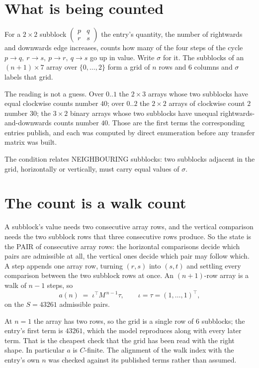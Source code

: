 \documentclass[11pt,a4paper]{article}
\theoremstyle{plain}
\theoremstyle{definition}
\begin{document}
\section{What is being counted}

For a $2\times2$ subblock $\begin{pmatrix}p&q\\r&s\end{pmatrix}$ the
entry's quantity, the number of rightwards and downwards edge increases, counts how many of the four steps of the cycle $p\to q,\ r\to s,\ p\to r,\ q\to s$ go up in value. Write $\sigma$ for it. The subblocks of an
$(n+1)\times7$ array over $\{0,\dots,2\}$ form a grid of $n$ rows and $6$
columns and $\sigma$ labels that grid.

The reading is not a guess. Over $0..1$ the $2\times3$ arrays whose two subblocks have equal
clockwise counts number $40$; over $0..2$ the $2\times2$ arrays of clockwise count $2$ number
$30$; the $3\times2$ binary arrays whose two subblocks have unequal rightwards-and-downwards
counts number $40$. Those are the first terms the corresponding entries publish, and each was
computed by direct enumeration before any transfer matrix was built.

The condition relates NEIGHBOURING subblocks: two subblocks adjacent in the grid, horizontally
or vertically, must carry equal values of $\sigma$.

\section{The count is a walk count}

A subblock's value needs two consecutive array rows, and the vertical
comparison needs the two subblock rows that three consecutive rows produce. So the state is the
PAIR of consecutive array rows: the horizontal comparisons decide which pairs are admissible at
all, the vertical ones decide which pair may follow which. A step appends one array row,
turning $(r,s)$ into $(s,t)$ and settling every comparison between the two subblock rows at
once. An $(n+1)$-row array is a walk of $n-1$ steps, so
\[
a(n)\;=\;\iota^{\!\top}M^{\,n-1}\tau,\qquad\iota=\tau=(1,\dots,1)^{\!\top},
\]
on the $S=43261$ admissible pairs.

At $n=1$ the array has two rows, so the grid is a single row of $6$
subblocks; the entry's first term is $43261$, which the model
reproduces along with every later term. That is the cheapest check that the grid has been read
with the right shape.
In particular $a$ is $C$-finite. The alignment of the walk index with the entry's own $n$ was
checked against its published terms rather than assumed.
\end{document}
